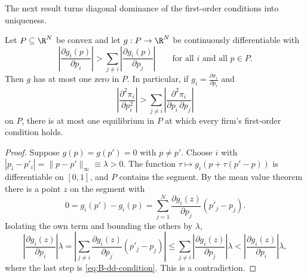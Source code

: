 The next result turns diagonal dominance of the first-order conditions into uniqueness.

\begin{proposition}\label{prop:B-dd-uniqueness}
Let $P \subseteq \R^N$ be convex and let $g: P \to \R^N$ be continuously differentiable with
\begin{equation}\label{eq:B-dd-condition}
  \left|\frac{\partial g_i(p)}{\partial p_i}\right| > \sum_{j \neq i}\left|\frac{\partial g_i(p)}{\partial
  p_j}\right| \qquad \text{for all } i \text{ and all } p \in P.
\end{equation}
Then $g$ has at most one zero in $P$. In particular, if $g_i = \frac{\partial\pi_i}{\partial p_i}$ and
\begin{equation*}
  \left|\frac{\partial^2\pi_i}{\partial p_i^2}\right| > \sum_{j \neq i}\left|\frac{\partial^2\pi_i}{\partial
  p_i\,\partial p_j}\right|
\end{equation*}
on $P$, there is at most one equilibrium in $P$ at which every firm's first-order condition holds.
\end{proposition}

\begin{proof}
Suppose $g(p) = g(p') = 0$ with $p \neq p'$. Choose $i$ with $|p_i - p'_i| = \|p - p'\|_\infty \equiv \lambda >
0$. The function $\tau \mapsto g_i(p + \tau(p' - p))$ is differentiable on $[0,1]$, and $P$ contains the
segment. By the mean value theorem there is a point $z$ on the segment with
\begin{equation*}
  0 = g_i(p') - g_i(p) = \sum_{j=1}^{N}\frac{\partial g_i(z)}{\partial p_j}(p'_j - p_j).
\end{equation*}
Isolating the own term and bounding the others by $\lambda$,
\begin{equation*}
  \left|\frac{\partial g_i(z)}{\partial p_i}\right|\lambda = \left|\sum_{j \neq i}\frac{\partial
  g_i(z)}{\partial p_j}(p'_j - p_j)\right| \leq \sum_{j \neq i}\left|\frac{\partial g_i(z)}{\partial
  p_j}\right|\lambda < \left|\frac{\partial g_i(z)}{\partial p_i}\right|\lambda,
\end{equation*}
where the last step is \eqref{eq:B-dd-condition}. This is a contradiction.
\end{proof}

